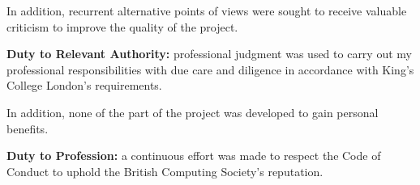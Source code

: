 In addition, recurrent alternative points of views were sought to receive valuable criticism to improve the quality of the project. \newline


\textbf{Duty to Relevant Authority:} professional judgment was used to carry out my professional responsibilities with due care and diligence in accordance with King's College London's requirements. 

In addition, none of the part of the project was developed to gain personal benefits. \newline


\textbf{Duty to Profession:} a continuous effort was made to respect the Code of Conduct to uphold the British Computing Society's reputation. \newline 